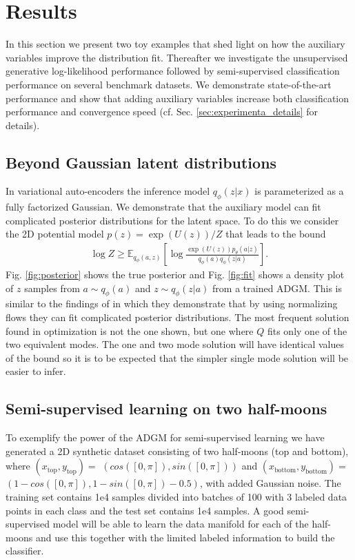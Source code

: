 \documentclass{article}
\begin{document}
\section{Results} 
In this section we present two toy examples that shed light on how the auxiliary variables improve the distribution fit. Thereafter we investigate the unsupervised generative log-likelihood performance followed by semi-supervised classification performance on several benchmark datasets. We demonstrate state-of-the-art performance and show that adding auxiliary variables increase both classification performance and convergence speed (cf. Sec. \ref{sec:experimenta_details} for details).

\subsection{Beyond Gaussian latent distributions}\label{sec:vae_toy}In variational auto-encoders the inference model $q_\phi(z|x)$ is parameterized as a fully factorized Gaussian. We demonstrate that the auxiliary model can fit complicated posterior distributions for the latent space. To do this we consider the 2D potential model $p(z)=\exp(U(z))/Z$ \citep{Rezende2015} that leads to the bound
\begin{align}
\log Z \ge \mathbb{E}_{q_\phi(a,z)}
\left[ \log
\frac{\exp(U(z)) p_\theta(a|z)}{  q_\phi(a)q_\phi(z|a)} 
\right] .
\end{align}
Fig. \ref{fig:posterior} shows the true posterior and Fig. \ref{fig:fit} shows a density plot of $z$ samples from $a\sim q_\phi(a)$ and $z\sim q_\phi(z|a)$ from a trained ADGM. This is similar to the findings of \citet{Rezende2015} in which they demonstrate that by using normalizing flows they can fit complicated posterior distributions. The most frequent solution found in optimization is not the one shown, but one where $Q$ fits only one of the two equivalent modes. The one and two mode solution will have identical values of the bound so it is to be expected that the simpler single mode solution will be easier to infer.

\subsection{Semi-supervised learning on two half-moons}\label{sec:halfmoons}
To exemplify the power of the ADGM for semi-supervised learning we have generated a 2D synthetic dataset consisting of two half-moons (top and bottom), where $(x_\text{top}, y_\text{top})=$ $(cos([0,\pi]),sin([0,\pi]))$ and $(x_\text{bottom}, y_\text{bottom})=$ $(1-cos([0,\pi]),1 - sin([0,\pi])-0.5)$, with added Gaussian noise. The training set contains 1e4 samples divided into batches of 100 with $3$ labeled data points in each class and the test set contains 1e4 samples. A good semi-supervised model will be able to learn the data manifold for each of the half-moons and use this together with the limited labeled information to build the classifier. 
\end{document}
